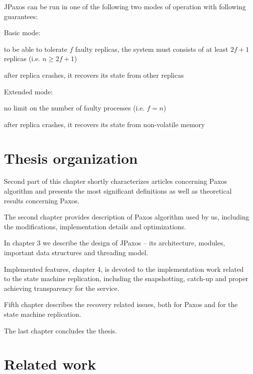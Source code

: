 JPaxos can be run in one of the following two modes of operation with following guarantees:\nopagebreak

Basic mode:
\begin{tightList}
  \item [\textbullet] to be able to tolerate $f$ faulty replicas, the system must consists of at least $2f + 1$ replicas (i.e. $n \ge 2f + 1$)
  \item [\textbullet] after replica crashes, it recovers its state from other replicas
\end{tightList}

Extended mode:
\begin{tightList}
  \item [\textbullet] no limit on the number of faulty processes (i.e. $f = n$)
  \item [\textbullet] after replica crashes, it recovers its state from non-volatile memory
\end{tightList}

\section{Thesis organization}


Second part of this chapter %
shortly characterizes articles concerning Paxos algorithm and presents the most significant definitions as well as theoretical results concerning Paxos.

The second chapter provides description of Paxos algorithm used by us, including the modifications, implementation details and optimizations.

In chapter 3 we describe the design of JPaxos -- its architecture, modules, important data structures and threading model.

Implemented features, chapter 4, is devoted to the implementation work related to the state machine replication, including the snapshotting, catch-up and proper achieving transparency for the service.

Fifth chapter describes the recovery related issues, both for Paxos and for the state machine replication.

The last chapter concludes the thesis.

\section{Related work}

